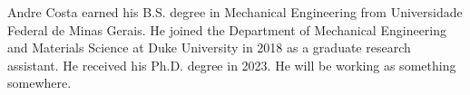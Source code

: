 \biography

Andre Costa earned his B.S. degree in Mechanical Engineering from 
Universidade Federal de Minas Gerais. He joined the Department of 
Mechanical Engineering and Materials Science at Duke University in 
2018 as a graduate research assistant. He received his Ph.D. degree 
in 2023. He will be working as something somewhere.
